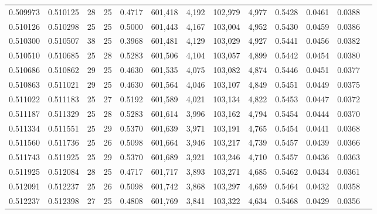 \begin{tabular}{rrrrrrrrrrrrr}
0.509973 & 0.510125 &    28 &  25 &                                     0.4717 & 601,418 &   4,192 & 102,979 &   4,977 & 0.5428 & 0.0461 & 0.0388 \\
0.510126 & 0.510298 &    25 &  25 &                                     0.5000 & 601,443 &   4,167 & 103,004 &   4,952 & 0.5430 & 0.0459 & 0.0386 \\
0.510300 & 0.510507 &    38 &  25 &                                     0.3968 & 601,481 &   4,129 & 103,029 &   4,927 & 0.5441 & 0.0456 & 0.0382 \\
0.510510 & 0.510685 &    25 &  28 &                                     0.5283 & 601,506 &   4,104 & 103,057 &   4,899 & 0.5442 & 0.0454 & 0.0380 \\
0.510686 & 0.510862 &    29 &  25 &                                     0.4630 & 601,535 &   4,075 & 103,082 &   4,874 & 0.5446 & 0.0451 & 0.0377 \\
0.510863 & 0.511021 &    29 &  25 &                                     0.4630 & 601,564 &   4,046 & 103,107 &   4,849 & 0.5451 & 0.0449 & 0.0375 \\
0.511022 & 0.511183 &    25 &  27 &                                     0.5192 & 601,589 &   4,021 & 103,134 &   4,822 & 0.5453 & 0.0447 & 0.0372 \\
0.511187 & 0.511329 &    25 &  28 &                                     0.5283 & 601,614 &   3,996 & 103,162 &   4,794 & 0.5454 & 0.0444 & 0.0370 \\
0.511334 & 0.511551 &    25 &  29 &                                     0.5370 & 601,639 &   3,971 & 103,191 &   4,765 & 0.5454 & 0.0441 & 0.0368 \\
0.511560 & 0.511736 &    25 &  26 &                                     0.5098 & 601,664 &   3,946 & 103,217 &   4,739 & 0.5457 & 0.0439 & 0.0366 \\
0.511743 & 0.511925 &    25 &  29 &                                     0.5370 & 601,689 &   3,921 & 103,246 &   4,710 & 0.5457 & 0.0436 & 0.0363 \\
0.511925 & 0.512084 &    28 &  25 &                                     0.4717 & 601,717 &   3,893 & 103,271 &   4,685 & 0.5462 & 0.0434 & 0.0361 \\
0.512091 & 0.512237 &    25 &  26 &                                     0.5098 & 601,742 &   3,868 & 103,297 &   4,659 & 0.5464 & 0.0432 & 0.0358 \\
0.512237 & 0.512398 &    27 &  25 &                                     0.4808 & 601,769 &   3,841 & 103,322 &   4,634 & 0.5468 & 0.0429 & 0.0356 \\

\end{tabular}
